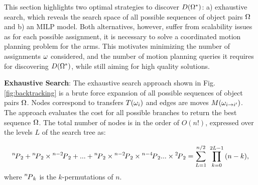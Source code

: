 This section highlights two optimal strategies to discover $\D(\scoma^*)$: a) exhaustive search, which reveals the search space of all possible sequences of object pairs $ \scoma $ and b) an MILP model. Both alternatives, however, suffer from scalability issues as for each possible assignment, it is necessary to solve a coordinated motion planning problem for the arms. This motivates minimizing the number of assignments $\coma$ considered, and the number of motion planning queries it requires for discovering $\D(\scoma^*)$, while still aiming for high quality solutions.

\noindent\textbf{Exhaustive Search}: The exhaustive search approach shown in Fig. \ref{fig:backtracking} is a brute force expansion of all possible sequences of object pairs $ \scoma $. Nodes correspond to transfers $T(\coma_i)$ and edges are moves $M(\coma_{i\rightarrow i{^\prime}})$. The approach evaluates the cost for all possible branches to return the best sequence $\scoma$. The total number of nodes is in the order of $O(n!)$, expressed over the levels $L$ of the search tree as: 

\begin{equation*}
{\permu[n]{2}} + {\permu[n]{2}}\times{\permu[n-2]{2}} + ... + {\permu[n]{2}}\times{\permu[n-2]{2}}\times{\permu[n-4]{2}}...\times{\permu[2]{2}} =\sum_{L=1}^{n/2} {\ \prod_{k=0}^{2L-1}{(n-k)}},
\end{equation*}
where $\permu[n]{k}$ is the $k$-permutations of $n$.  

